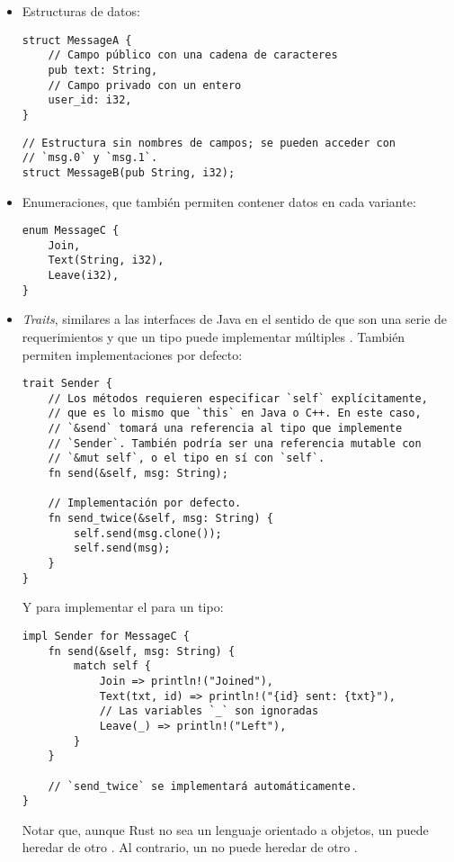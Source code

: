 \begin{itemize}
    \item Estructuras de datos:

\begin{verbatim}
struct MessageA {
    // Campo público con una cadena de caracteres
    pub text: String,
    // Campo privado con un entero
    user_id: i32,
}
\end{verbatim}

\begin{verbatim}
// Estructura sin nombres de campos; se pueden acceder con
// `msg.0` y `msg.1`.
struct MessageB(pub String, i32);
\end{verbatim}

    \item Enumeraciones, que también permiten contener datos en cada variante:

\begin{verbatim}
enum MessageC {
    Join,
    Text(String, i32),
    Leave(i32),
}
\end{verbatim}

    \item \emph{Traits}, similares a las interfaces de Java en el sentido de que
        son una serie de requerimientos y que un tipo puede implementar
        múltiples \traits. También permiten implementaciones por defecto:

\begin{verbatim}
trait Sender {
    // Los métodos requieren especificar `self` explícitamente,
    // que es lo mismo que `this` en Java o C++. En este caso,
    // `&send` tomará una referencia al tipo que implemente
    // `Sender`. También podría ser una referencia mutable con
    // `&mut self`, o el tipo en sí con `self`.
    fn send(&self, msg: String);

    // Implementación por defecto.
    fn send_twice(&self, msg: String) {
        self.send(msg.clone());
        self.send(msg);
    }
}
\end{verbatim}

Y para implementar el \trait para un tipo:

\begin{verbatim}
impl Sender for MessageC {
    fn send(&self, msg: String) {
        match self {
            Join => println!("Joined"),
            Text(txt, id) => println!("{id} sent: {txt}"),
            // Las variables `_` son ignoradas
            Leave(_) => println!("Left"),
        }
    }

    // `send_twice` se implementará automáticamente.
}
\end{verbatim}

    Notar que, aunque Rust no sea un lenguaje orientado a objetos, un
    \trait puede heredar de otro \trait. Al contrario, un \struct no puede
    heredar de otro \struct.

\end{itemize}

